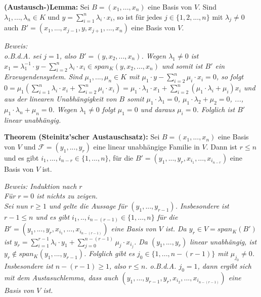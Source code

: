 \documentclass[11pt]{article}
\begin{document}
		\begin{mdframed}[backgroundcolor=blue!20]
			\textbf{(Austausch-)Lemma:} Sei $B=(x_1,...,x_n)$  eine Basis von $V$. Sind $\lambda_1,...,\lambda_n \in K$ und 
			$y=\sum\limits_{i=1}^n \lambda_i\cdot x_i$, so ist für jedes $j\in \{1,2,...,n\}$ mit $\lambda_j\neq 0$ auch 
			$B'=(x_1,...,x_{j-1},y,x_{j+1},...,x_n)$ eine Basis von $V$.
		\end{mdframed}
		\textit{Beweis: \\
		o.B.d.A. sei $j=1$, also $B'=(y,x_2,...,x_n)$. Wegen $\lambda_1\neq 0$ ist $x_1=\lambda_1^{-1}\cdot y - \sum
		\limits_{i=2}^n \lambda_i\cdot x_i \in span_K(y,x_2,...,x_n)$ und somit ist $B'$ ein Erzeugendensystem. Sind 
		$\mu_1,...,\mu_n \in K$ mit $\mu_1\cdot y - \sum\limits_{i=2}^n \mu_i\cdot x_i=0$, so folgt $0=\mu_1(\sum
		\limits_{i=1}^n \lambda_i\cdot x_i + \sum\limits_{i=2}^n \mu_i\cdot x_i)=\mu_1\cdot \lambda_1\cdot x_1 + \sum
		\limits_{i=2}^n (\mu_1\cdot \lambda_i + \mu_i)x_i$ und aus der linearen Unabhängigkeit von $B$ somit $\mu_1\cdot 
		\lambda_1=0$, $\mu_1\cdot \lambda_2 + \mu_2 =0$, ..., $\mu_1\cdot\lambda_n + \mu_n=0$. Wegen $\lambda_1\neq 0$ folgt 
		$\mu_1=0$ und daraus $\mu_i=0$. Folglich ist $B'$ linear unabhängig.} \\
		
		\begin{mdframed}[backgroundcolor=blue!20]
			\textbf{Theorem (Steinitz'scher Austauschsatz):} Sei $B=(x_1,...,x_n)$ eine Basis von $V$ und $\mathcal F=(y_1,...
			,y_r)$ eine linear unabhängige Familie in $V$. Dann ist $r\le n$ und es gibt $i_1,...,i_{n-r} \in \{1,...,n\}$, für 
			die $B'=(y_1,...,y_r,x_{i_1},...,x_{i_{n-r}})$ eine Basis von $V$ ist. 
		\end{mdframed}
		\textit{Beweis: Induktion nach $r$\\
		Für $r=0$ ist nichts zu zeigen. \\
		Sei nun $r\ge 1$ und gelte die Aussage für $(y_1,...,y_{r-1})$. Insbesondere ist $r-1\le n$ und es gibt $i_1,..,
		i_{n-(r-1)} \in \{1,...,n\}$ für die $B'=(y_1,...,y_r,x_{i_1},...,x_{i_{n-(r-1)}})$ eine Basis von $V$ ist. Da $y_r
		\in V=span_K(B')$ ist $y_r=\sum\limits_{i=1}^{r-1} \lambda_i\cdot y_1 + \sum\limits_{j=0}^{n-(r-1)} \mu_j\cdot 
		x_{i_j}$. Da $(y_1,...,y_r)$ linear unabhängig, ist $y_r \notin span_K(y_1,...,y_{r-1})$. Folglich gibt es $j_0 \in 
		\{1,...,n-(r-1)\}$ mit $\mu_{j_0}\neq 0$. Insbesondere ist $n-(r-1)\ge 1$, also $r\le n$. o.B.d.A. $j_0=1$, dann 
		ergibt sich mit dem Austasuchlemma, dass auch $(y_1,...,y_{r-1},y_r,x_{i_2},...,x_{i_{n-(r-1)}})$ eine Basis von 
		$V$ ist.} \\
		
\end{document}
